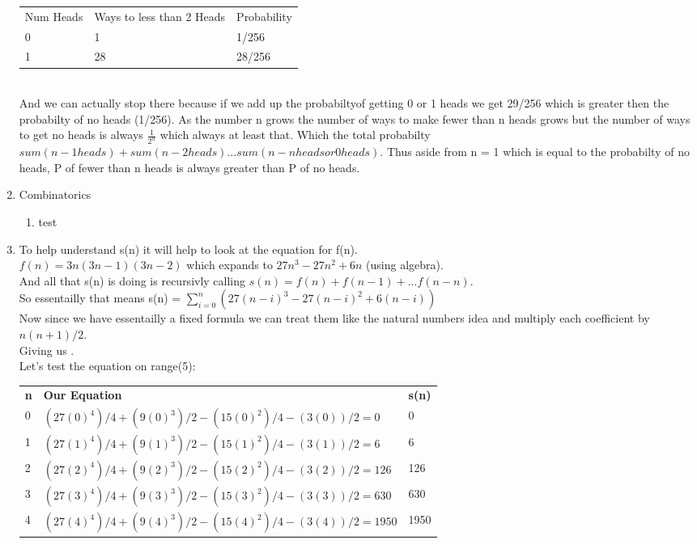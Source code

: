 \documentclass{article}
\begin{document}
\begin{enumerate}
      \begin{tabular}{lll}
      Num Heads & Ways to less than 2 Heads & Probability \\
      0         & 1                 & 1/256       \\
      1         & 28                & 28/256     
      \end{tabular} \\

      And we can actually stop there because if we add up the probabiltyof getting 0 or 1 heads we get 29/256 which is greater then the probabilty of no heads (1/256).
      As the number n grows the number of ways to make fewer than n heads grows but the number of ways to get no heads is always $\frac{1}{2^n}$ which always at least that. Which the total probabilty $sum(n - 1 heads) + sum(n - 2 heads) ... sum(n - n heads or 0 heads)$.
      Thus aside from n = 1 which is equal to the probabilty of no heads, P of fewer than n heads is always greater than P of no heads.

      \item Combinatorics
      \begin{enumerate}
        \item test
      \end{enumerate}

      \item To help understand s(n) it will help to look at the equation for f(n). \\
      $f(n) = 3n(3n - 1)(3n - 2)$ which expands to $27n^3 - 27n^2 + 6n$ (using algebra). \\
      And all that s(n) is doing is recursivly calling $s(n) = f(n) + f(n - 1) + ... f(n - n)$.\\
      So essentailly that means s(n) = $\sum_{i=0}^n (27(n - i)^3 - 27(n - i)^2 + 6(n - i))$ \\
      Now since we have essentailly a fixed formula we can treat them like the natural numbers idea and multiply each coefficient by $n(n+1)/2$.\\
      Giving us .\\

      Let's test the equation on range(5):\\
      \begin{tabular}{lll}
        \textbf{n} & \textbf{Our Equation} & \textbf{s(n)} \\
        0 & $(27 (0)^4)/4 + (9 (0)^3)/2 - (15 (0)^2)/4 - (3 (0))/2 = 0$ & 0       \\
        1 & $(27 (1)^4)/4 + (9 (1)^3)/2 - (15 (1)^2)/4 - (3 (1))/2 = 6$ & 6       \\
        2 & $(27 (2)^4)/4 + (9 (2)^3)/2 - (15 (2)^2)/4 - (3 (2))/2 = 126$ & 126       \\
        3 & $(27 (3)^4)/4 + (9 (3)^3)/2 - (15 (3)^2)/4 - (3 (3))/2 = 630$ & 630       \\
        4 & $(27 (4)^4)/4 + (9 (4)^3)/2 - (15 (4)^2)/4 - (3 (4))/2 = 1950$ & 1950       \\
        \end{tabular} \\


\end{enumerate}
\end{document}
